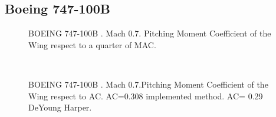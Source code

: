 \subsection{Boeing 747-100B}

\begin{figure}[H]
\centering

\caption{BOEING 747-100B . Mach 0.7. Pitching Moment Coefficient of the Wing respect to a quarter of MAC.}
\label{fig:stallATR}
\end{figure}
\noindent\\
\begin{figure}[H]
\centering

\caption{BOEING 747-100B . Mach 0.7.Pitching Moment Coefficient of the Wing respect to AC. AC=0.308 implemented method. AC= 0.29 DeYoung Harper.}
\label{fig:stallATR}
\end{figure}
